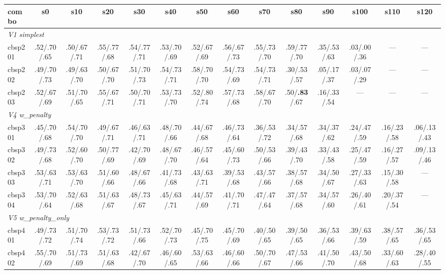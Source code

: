 \documentclass[10pt]{article}
\newcommand{\collapsed}{\cellcolor{red!25}}
\newcommand{\stable}{\cellcolor{green!20}}
\newcommand{\drift}{\cellcolor{yellow!25}}
\newcommand{\peak}{\cellcolor{blue!15}}
\begin{document}
\begin{center}
\scriptsize
\setlength{\tabcolsep}{3pt}
\begin{tabular}{l|ccccccccccccc}
\toprule
combo   & s0 & s10 & s20 & s30 & s40 & s50 & s60 & s70 & s80 & s90 & s100 & s110 & s120 \\
\midrule
\multicolumn{14}{l}{\emph{V1 simplest}} \\
cbsp201 & .52/.70/.65 & .50/.67/.71 & .55/.77/.68 & .54/.77/.71 & .53/.70/.69 & .52/.67/.69 & .56/.67/.73 & .55/.73/.70 & \peak .59/.77/.70 & .35/.53/.63 & \collapsed .03/.00/.36 & --- & --- \\
cbsp202 & .49/.70/.73 & .49/.63/.70 & .50/.67/.70 & .51/.70/.73 & .54/.73/.71 & \peak .58/.70/.70 & .54/.73/.69 & .54/.73/.71 & .30/.53/.57 & \collapsed .05/.17/.37 & \collapsed .03/.07/.29 & --- & --- \\
cbsp203 & .52/.67/.69 & .51/.70/.65 & .55/.67/.71 & .50/.70/.71 & .53/.73/.70 & .52/.80/.74 & .57/.73/.68 & .58/.67/.70 & \peak .50/\textbf{.83}/.67 & \collapsed .16/.33/.54 & --- & --- & --- \\
\midrule
\multicolumn{14}{l}{\emph{V4 w\_penalty}} \\
cbsp301 & .45/.70/.68 & .54/.70/.70 & .49/.67/.71 & .46/.63/.71 & .48/\peak .70/.66 & .44/.67/.68 & .46/.73/.64 & .36/.53/.72 & .34/.57/.68 & .34/.37/.62 & .24/.47/.59 & .16/.23/.58 & \collapsed .06/.13/.43 \\
cbsp302 & .49/.73/.68 & .52/.60/.70 & .50/\peak .77/.69 & .42/.70/.69 & .48/.67/.70 & .46/.57/.64 & .45/.60/.73 & .50/.53/.66 & .39/.43/.70 & .33/.43/.58 & .25/.47/.59 & .16/.27/.57 & \collapsed .09/.13/.46 \\
cbsp303 & .53/.63/.71 & .53/.63/.70 & .51/.60/.66 & .48/.67/.66 & .41/\peak .73/.68 & .43/.63/.71 & .39/.53/.68 & .43/.57/.66 & .38/.57/.68 & .34/.50/.67 & .27/.33/.63 & \collapsed .15/.30/.58 & --- \\
cbsp304 & .53/.70/.64 & .52/.63/.68 & .51/.63/.67 & .48/\peak .73/.67 & .45/.63/.71 & .44/.57/.69 & .41/.70/.71 & .47/.47/.64 & .37/.57/.68 & .34/.57/.60 & .26/.40/.61 & \collapsed .20/.37/.54 & --- \\
\midrule
\multicolumn{14}{l}{\emph{V5 w\_penalty\_only}} \\
cbsp401 & .49/.73/.72 & .51/.70/.74 & .53/\peak .73/.72 & .51/.73/.66 & .52/.70/.73 & .45/.70/.75 & .45/.70/.69 & .40/.50/.65 & .39/.50/.65 & .36/.53/.66 & .39/.63/.59 & .38/.57/.65 & \stable .36/.53/.65 \\
cbsp402 & .55/.70/.69 & .51/\peak .73/.69 & .51/.63/.68 & .42/.67/.70 & .46/.60/.65 & .53/.63/.66 & .46/.60/.66 & .50/.70/.67 & .47/.53/.66 & .41/.50/.70 & .43/.50/.68 & .33/.60/.63 & \drift .28/.40/.55 \\

\end{tabular}
\end{center}
\end{document}
